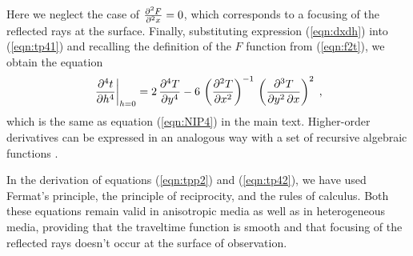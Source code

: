 Here we neglect the case of ${{\partial^2 F} \over {\partial^2 x}} =
0$, which corresponds to a focusing of the reflected rays at the
surface.  Finally, substituting expression (\ref{eqn:dxdh}) into (\ref{eqn:tp41})
and recalling the definition of the $F$ function
from (\ref{eqn:f2t}), we obtain
the equation
\begin{equation}
\left.{{\partial^4 t} \over {\partial h^4}}\right|_{h=0}  = 
2\,{{\partial^4 T} \over {\partial y^4}}-
6\,\left({{\partial^2 T} \over {\partial x^2}}\right)^{-1}\,
\left({{\partial^3 T} \over {\partial y^2\,\partial x}}\right)^2\;,
\label{eqn:tp42} 
\end{equation}
which is the same as equation (\ref{eqn:NIP4}) in the main
text. Higher-order derivatives can be expressed in an analogous way
with a set of recursive algebraic functions \cite[]{fomel}.

In the derivation of equations (\ref{eqn:tpp2}) and (\ref{eqn:tp42}),
we have used Fermat's principle, the principle of reciprocity, and the
rules of calculus. Both these equations remain valid in anisotropic
media as well as in heterogeneous media, providing that the traveltime
function is smooth and that focusing of the reflected rays doesn't
occur at the surface of observation.




